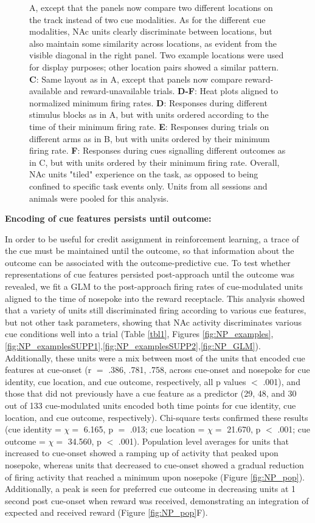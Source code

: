 \documentclass[11pt]{article}
\newcommand{\bsf}[1]{\textbf{#1}}
\begin{document}
\begin{figure}[ht!]
{A, except that the panels now compare two different locations on the track
instead of two cue modalities. As for the different cue modalities, NAc units
clearly discriminate between locations, but also maintain some similarity
across locations, as evident from the visible diagonal in the right panel. Two
example locations were used for display purposes; other location pairs showed
a similar pattern. \bsf{C}: Same layout as in A, except that panels now
compare reward-available and reward-unavailable trials. \bsf{D-F}: Heat plots
aligned to normalized minimum firing rates. \bsf{D}: Responses during
different stimulus blocks as in A, but with units ordered according to the
time of their minimum firing rate. \bsf{E}: Responses during trials on
different arms as in B, but with units ordered by their minimum firing
rate. \bsf{F}: Responses during cues signalling different outcomes as in C,
but with units ordered by their minimum firing rate. Overall, NAc units
"tiled" experience on the task, as opposed to being confined to specific task
events only. Units from all sessions and animals were pooled for this
analysis.}
\label{fig:tiling}
\end{figure} \clearpage

{\bf Encoding of cue features persists until outcome:}

In order to be useful for credit assignment in reinforcement learning, a trace of the cue must be maintained until the outcome, so that information about the outcome can be associated with the outcome-predictive cue. To test whether representations of cue features persisted post-approach until the outcome was revealed, we fit a GLM to the post-approach firing rates of cue-modulated units aligned to the time of nosepoke into the reward receptacle. This analysis
showed that a variety of units still discriminated firing according to various cue features, but not other task parameters, showing that NAc activity discriminates various cue conditions well into a trial (Table \ref{tbl1}, Figures \ref{fig:NP_examples},\ref{fig:NP_examplesSUPP1},\ref{fig:NP_examplesSUPP2},\ref{fig:NP_GLM}). Additionally, these units were a mix between most of the units that encoded cue features at cue-onset (r $=$ .386, .781, .758, across cue-onset and nosepoke for cue identity, cue location, and cue outcome, respectively, all p values $<$ .001), and those that did not previously have a cue feature as a predictor (29, 48, and 30 out of 133 cue-modulated units encoded both time points for cue identity, cue location, and cue outcome, respectively). Chi-square tests confirmed these results (cue identity =  $\chi =$ 6.165, p $=$ .013; cue location = $\chi =$ 21.670, p $<$ .001; cue outcome = $\chi =$ 34.560, p $<$ .001). Population level averages for units that increased to cue-onset showed a ramping up of activity that peaked upon nosepoke, whereas units that decreased to cue-onset showed a gradual reduction of firing activity that reached a minimum upon nosepoke (Figure \ref{fig:NP_pop}). Additionally, a peak is seen for preferred cue outcome in decreasing units at 1 second post cue-onset when reward was received, demonstrating an integration of expected and received reward (Figure \ref{fig:NP_pop}F). 
\end{document}
